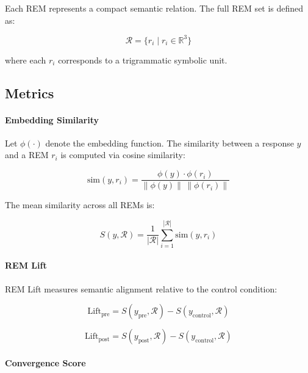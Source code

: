 \documentclass[11pt]{article}
\begin{document}
Each REM represents a compact semantic relation. The full REM set is defined as:

\begin{equation}
\mathcal{R} = \{r_i \mid r_i \in \mathbb{R}^3\}
\end{equation}

where each $r_i$ corresponds to a trigrammatic symbolic unit.

\subsection{Metrics}

\paragraph{Embedding Similarity}

Let $\phi(\cdot)$ denote the embedding function. The similarity between a response $y$ and a REM $r_i$ is computed via cosine similarity:

\begin{equation}
\text{sim}(y, r_i) = \frac{\phi(y) \cdot \phi(r_i)}{\|\phi(y)\| \, \|\phi(r_i)\|}
\end{equation}

The mean similarity across all REMs is:

\begin{equation}
S(y, \mathcal{R}) = \frac{1}{|\mathcal{R}|} \sum_{i=1}^{|\mathcal{R}|} \text{sim}(y, r_i)
\end{equation}

\paragraph{REM Lift}

REM Lift measures semantic alignment relative to the control condition:

\begin{equation}
\text{Lift}_{\text{pre}} = S(y_{\text{pre}}, \mathcal{R}) - S(y_{\text{control}}, \mathcal{R})
\end{equation}

\begin{equation}
\text{Lift}_{\text{post}} = S(y_{\text{post}}, \mathcal{R}) - S(y_{\text{control}}, \mathcal{R})
\end{equation}

\paragraph{Convergence Score}
\end{document}
